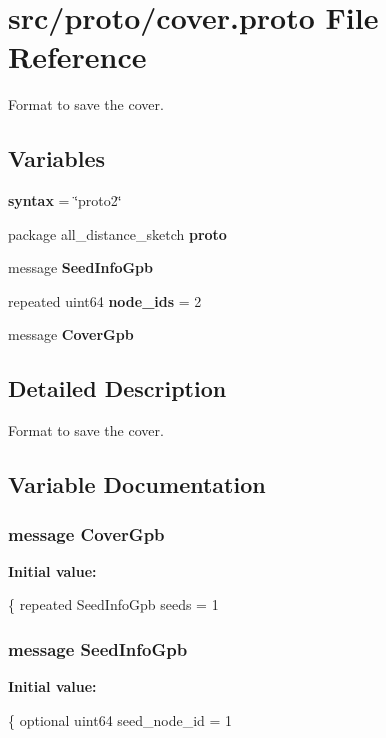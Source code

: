 \hypertarget{cover_8proto}{}\section{src/proto/cover.proto File Reference}
\label{cover_8proto}


Format to save the cover.  


\subsection*{Variables}
\begin{DoxyCompactItemize}
\item 
\hypertarget{cover_8proto_adbedb258e13546cc707a6ebb073a3d8a}{}{\bfseries syntax} = \char`\"{}proto2\char`\"{}\label{cover_8proto_adbedb258e13546cc707a6ebb073a3d8a}

\item 
\hypertarget{cover_8proto_a0c41dcc24abdb230ee669507323945ae}{}package all\+\_\+distance\+\_\+sketch {\bfseries proto}\label{cover_8proto_a0c41dcc24abdb230ee669507323945ae}

\item 
message {\bfseries Seed\+Info\+Gpb}
\item 
\hypertarget{cover_8proto_ae2d95f729a2bdf39ca6bc12018ec7b1a}{}repeated uint64 {\bfseries node\+\_\+ids} = 2\label{cover_8proto_ae2d95f729a2bdf39ca6bc12018ec7b1a}

\item 
message {\bfseries Cover\+Gpb}
\end{DoxyCompactItemize}


\subsection{Detailed Description}
Format to save the cover. 



\subsection{Variable Documentation}
\hypertarget{cover_8proto_af42b0188a43fe496a8edc48ab95b741a}{}
\subsubsection[{Cover\+Gpb}]{\setlength{\rightskip}{0pt plus 5cm}message Cover\+Gpb}\label{cover_8proto_af42b0188a43fe496a8edc48ab95b741a}
{\bfseries Initial value\+:}
\begin{DoxyCode}
\{
  repeated SeedInfoGpb seeds = 1
\end{DoxyCode}
\hypertarget{cover_8proto_a8daceb38bc294918fb46071b582b9039}{}
\subsubsection[{Seed\+Info\+Gpb}]{\setlength{\rightskip}{0pt plus 5cm}message Seed\+Info\+Gpb}\label{cover_8proto_a8daceb38bc294918fb46071b582b9039}
{\bfseries Initial value\+:}
\begin{DoxyCode}
\{
  optional uint64 seed\_node\_id = 1
\end{DoxyCode}
